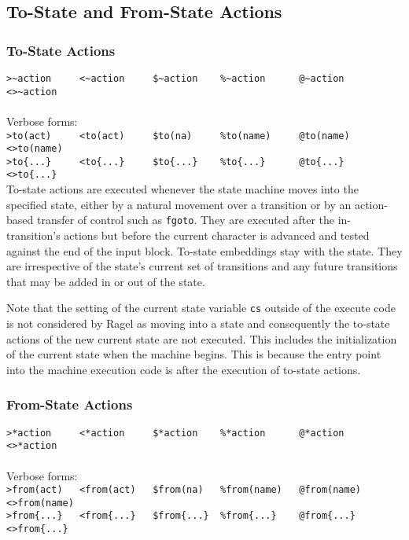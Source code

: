 \documentclass[letterpaper,11pt,oneside]{book}
\begin{document}


\subsection{To-State and From-State Actions}

\subsubsection{To-State Actions}

\noindent\verb|>~action     <~action     $~action    %~action      @~action      <>~action|\\
\\
\noindent Verbose forms:\\
\noindent\verb|>to(act)     <to(act)     $to(na)     %to(name)     @to(name)     <>to(name)|\\
\noindent\verb|>to{...}     <to{...}     $to{...}    %to{...}      @to{...}      <>to{...}|
\\


To-state actions are executed whenever the state machine moves into the
specified state, either by a natural movement over a transition or by an
action-based transfer of control such as \verb|fgoto|. They are executed after the
in-transition's actions but before the current character is advanced and
tested against the end of the input block. To-state embeddings stay with the
state. They are irrespective of the state's current set of transitions and any
future transitions that may be added in or out of the state.

Note that the setting of the current state variable \verb|cs| outside of the
execute code is not considered by Ragel as moving into a state and consequently
the to-state actions of the new current state are not executed. This includes
the initialization of the current state when the machine begins.  This is
because the entry point into the machine execution code is after the execution
of to-state actions.

\subsubsection{From-State Actions}

\noindent\verb|>*action     <*action     $*action    %*action      @*action      <>*action|\\
\\
\noindent Verbose forms:\\
\noindent\verb|>from(act)   <from(act)   $from(na)   %from(name)   @from(name)   <>from(name)|\\
\noindent\verb|>from{...}   <from{...}   $from{...}  %from{...}    @from{...}    <>from{...}|
\\
\end{document}
